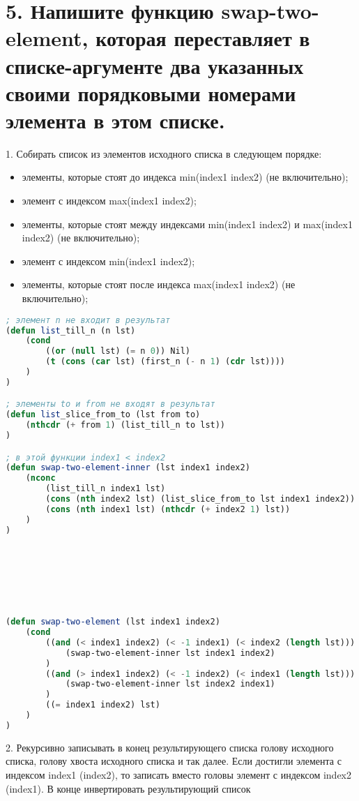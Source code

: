 \documentclass[12pt]{report}
\begin{document}
\clearpage
\section*{5. Напишите функцию swap-two-element, которая переставляет в списке-аргументе два указанных своими порядковыми номерами элемента в этом списке.}

1. Собирать список из элементов исходного списка в следующем порядке: 
\begin{itemize}
	\item элементы, которые стоят до индекса min(index1 index2) (не включительно);
	\item элемент с индексом max(index1 index2);
	\item элементы, которые стоят между индексами min(index1 index2) и max(index1 index2) (не включительно);
	\item элемент с индексом min(index1 index2);
	\item элементы, которые стоят после индекса max(index1 index2) (не включительно);
\end{itemize}


\begin{lstlisting}[language=Lisp]
; элемент n не входит в результат
(defun list_till_n (n lst) 
	(cond 
		((or (null lst) (= n 0)) Nil)
		(t (cons (car lst) (first_n (- n 1) (cdr lst))))
	)
)

; элементы to и from не входят в результат
(defun list_slice_from_to (lst from to)
	(nthcdr (+ from 1) (list_till_n to lst))
)

; в этой функции index1 < index2
(defun swap-two-element-inner (lst index1 index2)
	(nconc 
		(list_till_n index1 lst)
		(cons (nth index2 lst) (list_slice_from_to lst index1 index2))
		(cons (nth index1 lst) (nthcdr (+ index2 1) lst))	
	)
)







(defun swap-two-element (lst index1 index2)
	(cond 
		((and (< index1 index2) (< -1 index1) (< index2 (length lst)))
			(swap-two-element-inner lst index1 index2)
		)
		((and (> index1 index2) (< -1 index2) (< index1 (length lst)))
			(swap-two-element-inner lst index2 index1)
		)
		((= index1 index2) lst)
	)
)
\end{lstlisting}



2. Рекурсивно записывать в конец результирующего списка голову исходного списка, голову хвоста исходного списка и так далее. Если достигли элемента с индексом index1 (index2), то записать вместо головы элемент с индексом index2 (index1). В конце инвертировать результирующий список
\end{document}
